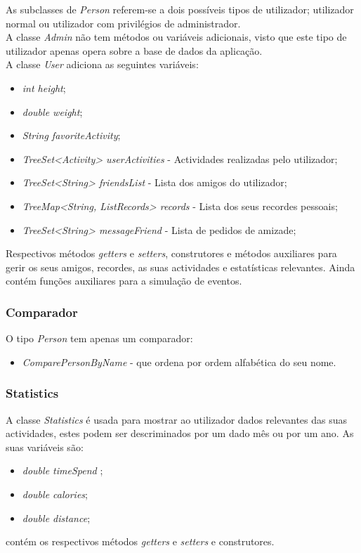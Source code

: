 \documentclass[10pt,notitlepage]{article}
\begin{document}
As subclasses de \textit{Person} referem-se a dois possíveis tipos de utilizador; utilizador normal ou utilizador com privilégios de administrador.\\
A classe \textit{Admin} não tem métodos ou variáveis adicionais, visto que este tipo de utilizador apenas opera sobre a base de dados da aplicação.\\
A classe \textit{User} adiciona as seguintes variáveis:
\begin{itemize}
\item \textit{int height};
\item \textit{double weight};
\item \textit{String favoriteActivity};
\item \textit{TreeSet<Activity> userActivities} - Actividades realizadas pelo utilizador;
\item \textit{TreeSet<String> friendsList} - Lista dos amigos do utilizador;
\item \textit{TreeMap<String, ListRecords> records} - Lista dos seus recordes pessoais;
\item \textit{TreeSet<String> messageFriend} - Lista de pedidos de amizade;
\end{itemize}
Respectivos métodos \textit{getters} e \textit{setters}, construtores e métodos auxiliares para gerir os seus amigos, recordes, as suas actividades e estatísticas relevantes. Ainda contém funções auxiliares para a simulação de eventos.

\subsubsection{Comparador}
O tipo \textit{Person} tem apenas um comparador:
\begin{itemize}
\item \textit{ComparePersonByName} - que ordena por ordem alfabética do seu nome.
\end{itemize}


\subsubsection{Statistics}

A classe \textit{Statistics} é usada para mostrar ao utilizador dados relevantes das suas actividades, estes podem ser descriminados por um dado mês ou por um ano. As suas variáveis são:
\begin{itemize}
\item \textit{double timeSpend} ;
\item \textit{double calories};
\item \textit{double distance};
\end{itemize}
contém os respectivos métodos \textit{getters} e \textit{setters} e construtores.
\end{document}
